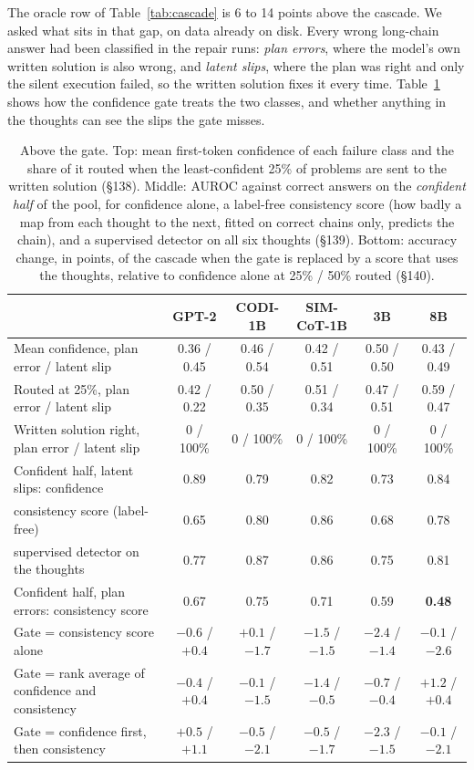 \documentclass{article}
\begin{document}
The oracle row of Table~\ref{tab:cascade} is 6 to 14 points above the cascade. We asked what sits in that gap, on data already on disk. Every wrong long-chain answer had been classified in the repair runs: \emph{plan errors}, where the model's own written solution is also wrong, and \emph{latent slips}, where the plan was right and only the silent execution failed, so the written solution fixes it every time. Table~\ref{tab:headroom} shows how the confidence gate treats the two classes, and whether anything in the thoughts can see the slips the gate misses.

\begin{table}[h]
\caption{Above the gate. Top: mean first-token confidence of each failure class and the share of it routed when the least-confident 25\% of problems are sent to the written solution (\S138). Middle: AUROC against correct answers on the \emph{confident half} of the pool, for confidence alone, a label-free consistency score (how badly a map from each thought to the next, fitted on correct chains only, predicts the chain), and a supervised detector on all six thoughts (\S139). Bottom: accuracy change, in points, of the cascade when the gate is replaced by a score that uses the thoughts, relative to confidence alone at 25\% / 50\% routed (\S140).}
\label{tab:headroom}
\centering\scriptsize
\setlength{\tabcolsep}{3pt}
\begin{tabular}{lccccc}
\toprule
 & GPT-2 & CODI-1B & SIM-CoT-1B & 3B & 8B \\
\midrule
Mean confidence, plan error / latent slip & 0.36 / 0.45 & 0.46 / 0.54 & 0.42 / 0.51 & 0.50 / 0.50 & 0.43 / 0.49 \\
Routed at 25\%, plan error / latent slip & 0.42 / 0.22 & 0.50 / 0.35 & 0.51 / 0.34 & 0.47 / 0.51 & 0.59 / 0.47 \\
Written solution right, plan error / latent slip & 0 / 100\% & 0 / 100\% & 0 / 100\% & 0 / 100\% & 0 / 100\% \\
\midrule
Confident half, latent slips: confidence & 0.89 & 0.79 & 0.82 & 0.73 & 0.84 \\
\quad consistency score (label-free) & 0.65 & 0.80 & 0.86 & 0.68 & 0.78 \\
\quad supervised detector on the thoughts & 0.77 & 0.87 & 0.86 & 0.75 & 0.81 \\
Confident half, plan errors: consistency score & 0.67 & 0.75 & 0.71 & 0.59 & \textbf{0.48} \\
\midrule
Gate = consistency score alone & $-0.6$ / $+0.4$ & $+0.1$ / $-1.7$ & $-1.5$ / $-1.5$ & $-2.4$ / $-1.4$ & $-0.1$ / $-2.6$ \\
Gate = rank average of confidence and consistency & $-0.4$ / $+0.4$ & $-0.1$ / $-1.5$ & $-1.4$ / $-0.5$ & $-0.7$ / $-0.4$ & $+1.2$ / $+0.4$ \\
Gate = confidence first, then consistency & $+0.5$ / $+1.1$ & $-0.5$ / $-2.1$ & $-0.5$ / $-1.7$ & $-2.3$ / $-1.5$ & $-0.1$ / $-2.1$ \\
\bottomrule
\end{tabular}
\end{table}
\end{document}
